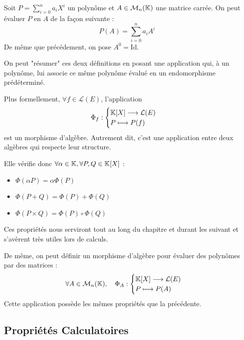 \begin{definition}
    Soit $P = \sum_{i=0}^{n} a_i X^i$ un polynôme et $A \in \mathcal{M}_n(\mathbb{K})$ une matrice carrée. 
    On peut évaluer $P$ en $A$ de la façon suivante :
        \[P(A) = \sum_{i=0}^{n} a_i A^i\]
    De même que précédement, on pose $A^0 = \text{Id}$.
\end{definition}


\begin{proposition}
    On peut "résumer" ces deux définitions en posant une application qui, à un polynôme, lui associe ce même polynôme évalué 
    en un endomorphisme prédéterminé. 

    Plus formellement, $ \forall f \in \mathcal{L}(E)$, l'application 
        \[ \Phi_f : 
            \begin{cases}
                \mathbb{K}[X] \longrightarrow \mathcal{L}(E) \\ 
                P \longmapsto P(f)
            \end{cases}
        \]
    est un morphisme d'algèbre. Autrement dit, c'est une application entre deux algèbres qui respecte leur structure. 
    
    Elle vérifie donc $ \forall \alpha \in \mathbb{K}, \forall P,Q \in \mathbb{K}[X]$ :
    \begin{itemize}
        \item $\Phi(\alpha P) = \alpha \Phi(P)$ 
        \item $\Phi(P+Q) = \Phi(P) + \Phi(Q)$ 
        \item $\Phi(P \times Q) = \Phi(P) \circ \Phi(Q)$ 
    \end{itemize}
    Ces propriétés nous serviront tout au long du chapitre et durant les suivant et s'avèrent très utiles lors de calculs. 
\end{proposition}

\begin{remark}
    De même, on peut définir un morphisme d'algèbre pour évaluer des polynômes par des matrices :
        \[ \forall A \in \mathcal{M}_n(\mathbb{K}), \quad \Phi_A : 
            \begin{cases}
                \mathbb{K}[X] \longrightarrow \mathcal{L}(E) \\ 
                P \longmapsto P(A)
            \end{cases}
        \]
    Cette application possède les mêmes propriétés que la précédente. 
\end{remark}


\subsection{Propriétés Calculatoires}

